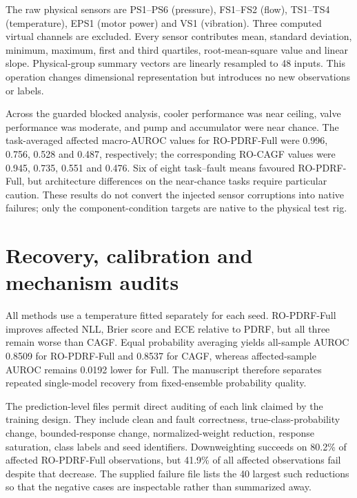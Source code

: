 \documentclass[10pt]{article}
\begin{document}
The raw physical sensors are PS1--PS6 (pressure), FS1--FS2 (flow), TS1--TS4 (temperature), EPS1 (motor power) and VS1 (vibration). Three computed virtual channels are excluded. Every sensor contributes mean, standard deviation, minimum, maximum, first and third quartiles, root-mean-square value and linear slope. Physical-group summary vectors are linearly resampled to 48 inputs. This operation changes dimensional representation but introduces no new observations or labels.

\begin{table}[ht]
\centering
\caption{Paired hydraulic PDRF-NOQ minus CAGF macro-AUROC effects. The minimum attainable non-zero two-sided exact Wilcoxon value with five same-direction pairs is 0.0625.}
\resizebox{0.78\textwidth}{!}{}
\end{table}

Across the guarded blocked analysis, cooler performance was near ceiling, valve performance was moderate, and pump and accumulator were near chance. The task-averaged affected macro-AUROC values for RO-PDRF-Full were 0.996, 0.756, 0.528 and 0.487, respectively; the corresponding RO-CAGF values were 0.945, 0.735, 0.551 and 0.476. Six of eight task--fault means favoured RO-PDRF-Full, but architecture differences on the near-chance tasks require particular caution. These results do not convert the injected sensor corruptions into native failures; only the component-condition targets are native to the physical test rig.

\section{Recovery, calibration and mechanism audits}

All methods use a temperature fitted separately for each seed. RO-PDRF-Full improves affected NLL, Brier score and ECE relative to PDRF, but all three remain worse than CAGF. Equal probability averaging yields all-sample AUROC 0.8509 for RO-PDRF-Full and 0.8537 for CAGF, whereas affected-sample AUROC remains 0.0192 lower for Full. The manuscript therefore separates repeated single-model recovery from fixed-ensemble probability quality.

The prediction-level files permit direct auditing of each link claimed by the training design. They include clean and fault correctness, true-class-probability change, bounded-response change, normalized-weight reduction, response saturation, class labels and seed identifiers. Downweighting succeeds on 80.2\% of affected RO-PDRF-Full observations, but 41.9\% of all affected observations fail despite that decrease. The supplied failure file lists the 40 largest such reductions so that the negative cases are inspectable rather than summarized away.
\end{document}
